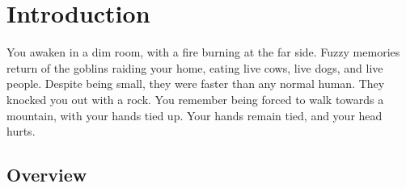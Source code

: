 \chapter{Introduction}

\epigraph{

  You awaken in a dim room, with a fire burning at the far side.
  Fuzzy memories return of the goblins raiding your home, eating live cows, live dogs, and live people.
  Despite being small, they were faster than any normal human.
  They knocked you out with a rock.
  You remember being forced to walk towards a mountain, with your hands tied up.
  Your hands remain tied, and your head hurts.
}{}

\section{Overview}


